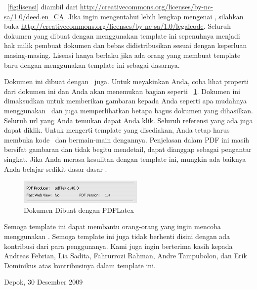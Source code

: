 \pic~\ref{fig:lisensi} diambil dari 
\url{http://creativecommons.org/licenses/by-nc-sa/1.0/deed.en_CA}. 
Jika ingin mengentahui lebih lengkap mengenai \license, silahkan buka 
\url{http://creativecommons.org/licenses/by-nc-sa/1.0/legalcode}. 
Seluruh dokumen yang dibuat dengan menggunakan template ini sepenuhnya 
menjadi hak milik pembuat dokumen dan bebas didistribusikan sesuai dengan 
keperluan masing-masing. 
Lisensi hanya berlaku jika ada orang yang membuat template baru dengan 
menggunakan template ini sebagai dasarnya. 

Dokumen ini dibuat dengan \latex~juga. Untuk meyakinkan Anda, coba lihat 
properti dari dokumen ini dan Anda akan menemukan bagian seperti 
\pic~\ref{fig:pdflatex}. 
Dokumen ini dimaksudkan untuk memberikan gambaran kepada Anda seperti apa 
mudahnya menggunakan \latex~dan juga memperlihatkan betapa bagus dokumen 
yang dihasilkan. 
Seluruh url yang Anda temukan dapat Anda klik. 
Seluruh referensi yang ada juga dapat diklik. 
Untuk mengerti template yang disediakan, Anda tetap harus membuka kode 
\latex~dan bermain-main dengannya. 
Penjelasan dalam PDF ini masih bersifat gambaran dan tidak begitu 
mendetail, dapat dianggap sebagai pengantar singkat. 
Jika Anda merasa kesulitan dengan template ini, mungkin ada baiknya 
Anda belajar sedikit dasar-dasar \latex. 

\begin{figure}
	\centering
	\includegraphics[width=0.54\textwidth]
		{assets/pics/mark.png}
	\caption{Dokumen Dibuat dengan PDFLatex}
	\label{fig:pdflatex}
\end{figure}

Semoga template ini dapat membantu orang-orang yang ingin mencoba menggunakan 
\latex. Semoga template ini juga tidak berhenti disini dengan ada kontribusi 
dari para penggunanya. 
Kami juga ingin berterima kasih kepada Andreas Febrian, Lia Sadita, Fahrurrozi 
Rahman, Andre Tampubolon, dan Erik Dominikus atas kontribusinya dalam template 
ini. 

\vspace*{0.1cm}
\begin{flushright}
Depok, 30 Desember 2009\\[0.1cm]
\vspace*{1cm}
\penulis

\end{flushright}